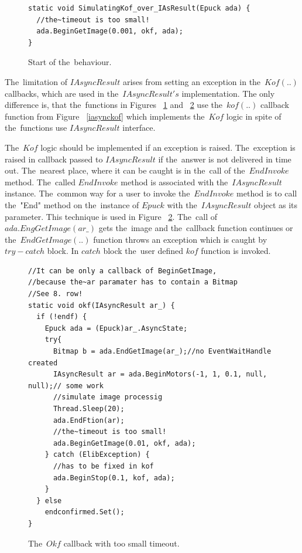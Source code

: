 \begin{figure}[!hbp]
\begin{lstlisting}
static void SimulatingKof_over_IAsResult(Epuck ada) {
  //the~timeout is too small!
  ada.BeginGetImage(0.001, okf, ada);
}
\end{lstlisting}
\caption{Start of the~behaviour.}
\label{c:start}
\end{figure}

  The~limitation of $IAsyncResult$ arises from setting an exception in the~$Kof(..)$ callbacks,
  which are used in the~$IAsyncResult's$ implementation.
  The only difference is, that the~functions in Figures ~\ref{c:start} 
  and ~\ref{c:okfsim} use the~$kof(..)$ callback function
  from Figure ~\ref{iasynckof} 
  which implements the~$Kof$ logic in spite of the~functions use $IAsyncResult$ interface.

  The~$Kof$ logic should be implemented if an exception is raised. 
  The~exception is raised in callback passed to $IAsyncResult$ if the~answer is not delivered in time out. 
  The~nearest place, where it can be caught is in the~call of the~$EndInvoke$ method.
  The~called $EndInvoke$ method is associated with the~$IAsyncResult$ instance. 
  The~common way for a user to invoke the~$EndInvoke$ method is to call the~"End" method 
  on the~instance of $Epuck$ with the~$IAsyncResult$ object as its parameter. 
  This technique is used in Figure ~\ref{c:okfsim}.
  The~call of $ada.EngGetImage(ar\_)$ gets the~image and the~callback function continues
  or the~$EndGetImage(..)$ function throws an exception which is caught by $try-catch$ block.
  In $catch$ block the~user defined $kof$ function is invoked.
  
\begin{figure}[!hbp]
\begin{lstlisting}
//It can be only a callback of BeginGetImage,
//because the~ar paramater has to contain a Bitmap
//See 8. row!
static void okf(IAsyncResult ar_) {
  if (!endf) {
    Epuck ada = (Epuck)ar_.AsyncState;
    try{
      Bitmap b = ada.EndGetImage(ar_);//no EventWaitHandle created
      IAsyncResult ar = ada.BeginMotors(-1, 1, 0.1, null, null);// some work
      //simulate image processig
      Thread.Sleep(20);
      ada.EndFtion(ar);
      //the~timeout is too small!
      ada.BeginGetImage(0.01, okf, ada);
    } catch (ElibException) {
      //has to be fixed in kof
      ada.BeginStop(0.1, kof, ada);
    }
  } else
    endconfirmed.Set();
}
\end{lstlisting}
\caption{The~$Okf$ callback with too small timeout.}
\label{c:okfsim}
\end{figure}

